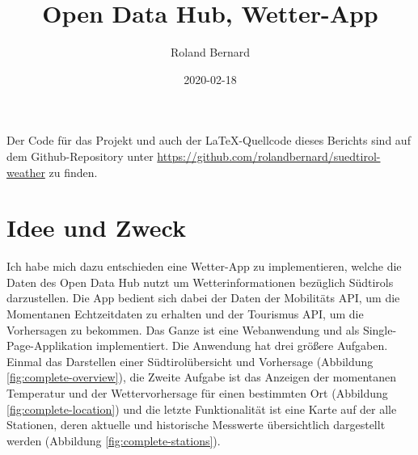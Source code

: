 \documentclass[a4paper,12pt]{article}
\title{Open Data Hub, Wetter-App}
\date{2020-02-18}
\author{Roland Bernard}
\begin{document}
\maketitle
\newpage

\tableofcontents
\listoffigures
\newpage

Der Code für das Projekt und auch der \LaTeX-Quellcode dieses Berichts sind
auf dem Github-Repository unter \url{https://github.com/rolandbernard/suedtirol-weather}
zu finden.

\section{Idee und Zweck}
Ich habe mich dazu entschieden eine Wetter-App zu implementieren, welche die
Daten des Open Data Hub nutzt um Wetterinformationen bezüglich Südtirols
darzustellen. Die App bedient sich dabei der Daten der Mobilitäts API, um die
Momentanen Echtzeitdaten zu erhalten und der Tourismus API, um die Vorhersagen
zu bekommen. Das Ganze ist eine Webanwendung und als Single-Page-Applikation
implementiert. Die Anwendung hat drei größere Aufgaben. Einmal das Darstellen
einer Südtirolübersicht und Vorhersage (Abbildung \ref{fig:complete-overview}),
die Zweite Aufgabe ist das Anzeigen der momentanen Temperatur und der
Wettervorhersage für einen bestimmten Ort (Abbildung \ref{fig:complete-location})
und die letzte Funktionalität ist eine Karte auf der alle Stationen, deren
aktuelle und historische Messwerte übersichtlich dargestellt werden
(Abbildung \ref{fig:complete-stations}).
\end{document}
